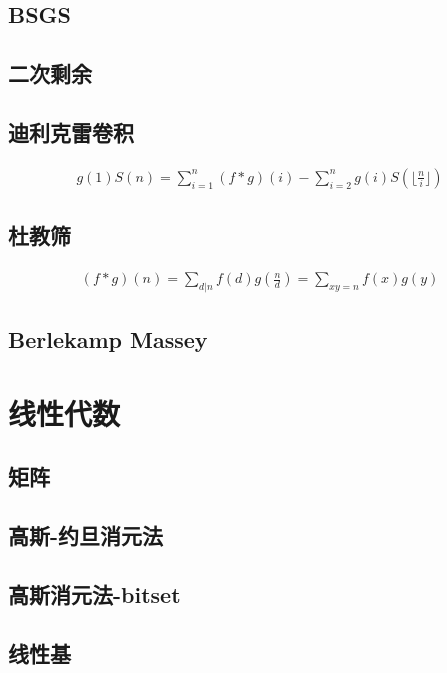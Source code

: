 \documentclass{article}
\begin{document}
\subsection{BSGS}

\subsection{二次剩余}

\subsection{迪利克雷卷积}

$$
\begin{aligned}
g(1)S(n)=\sum_{i=1}^n(f*g)(i)-\sum_{i=2}^ng(i)S(\lfloor\frac{n}{i}\rfloor)
\end{aligned}
$$

\subsection{杜教筛}

$$
\begin{aligned}
(f*g)(n)=\underset{d|n}{\sum} f(d)g(\frac{n}{d})=\underset{xy=n}{\sum} f(x)g(y)
\end{aligned}
$$

\subsection{Berlekamp Massey}


\section{线性代数}
\subsection{矩阵}

\subsection{高斯-约旦消元法}

\subsection{高斯消元法-bitset}

\subsection{线性基}

\end{document}
